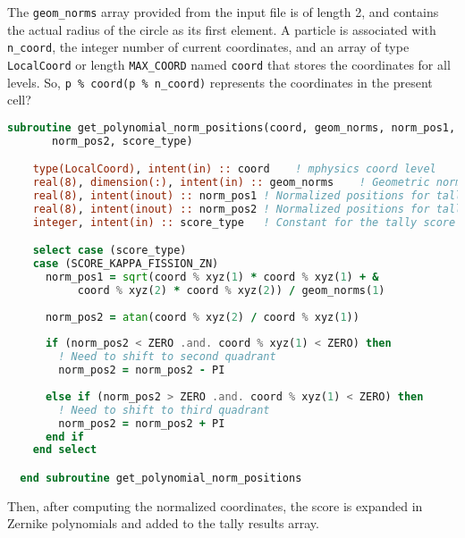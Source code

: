 \documentclass[10pt]{article}
\numberwithin{equation}{section} %
\begin{document}
The {\tt geom\_norms} array provided from the input file is of length 2, and contains the actual radius of the circle as its first element. A particle is associated with {\tt n\_coord}, the integer number of current coordinates, and an array of type {\tt LocalCoord} or length {\tt MAX\_COORD} named {\tt coord} that stores the coordinates for all levels. So, {\tt p \% coord(p \% n\_coord)} represents the coordinates in the present cell? 

\begin{lstlisting}[language=Fortran]
  subroutine get_polynomial_norm_positions(coord, geom_norms, norm_pos1, &
       norm_pos2, score_type)

    type(LocalCoord), intent(in) :: coord    ! mphysics coord level
    real(8), dimension(:), intent(in) :: geom_norms    ! Geometric norms for calculation
    real(8), intent(inout) :: norm_pos1 ! Normalized positions for tally
    real(8), intent(inout) :: norm_pos2 ! Normalized positions for tally
    integer, intent(in) :: score_type   ! Constant for the tally score type

    select case (score_type)
    case (SCORE_KAPPA_FISSION_ZN)
      norm_pos1 = sqrt(coord % xyz(1) * coord % xyz(1) + &
           coord % xyz(2) * coord % xyz(2)) / geom_norms(1)
           
      norm_pos2 = atan(coord % xyz(2) / coord % xyz(1))
      
      if (norm_pos2 < ZERO .and. coord % xyz(1) < ZERO) then
        ! Need to shift to second quadrant
        norm_pos2 = norm_pos2 - PI
        
      else if (norm_pos2 > ZERO .and. coord % xyz(1) < ZERO) then
        ! Need to shift to third quadrant
        norm_pos2 = norm_pos2 + PI
      end if
    end select

  end subroutine get_polynomial_norm_positions
\end{lstlisting}

Then, after computing the normalized coordinates, the score is expanded in Zernike polynomials and added to the tally results array.
			
\end{document}
